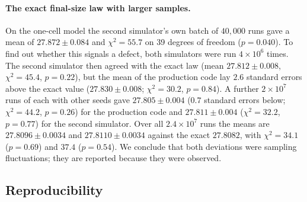 \paragraph{The exact final-size law with larger samples.} On the one-cell model the second simulator's own
batch of $40{,}000$ runs gave a mean of $27.872\pm0.084$ and $\chi^2=55.7$ on 39 degrees of freedom
($p=0.040$).
To find out whether this signals a defect, both simulators were run $4\times10^{6}$ times. The second
simulator then agreed with the exact law (mean $27.812\pm0.008$, $\chi^2=45.4$, $p=0.22$), but the mean of
the production code lay $2.6$ standard errors above the exact value ($27.830\pm0.008$; $\chi^2=30.2$,
$p=0.84$). A further $2\times10^{7}$ runs of each with other seeds gave $27.805\pm0.004$ ($0.7$ standard errors
below; $\chi^2=44.2$, $p=0.26$) for the production code and $27.811\pm0.004$ ($\chi^2=32.2$, $p=0.77$) for the
second simulator. Over all $2.4\times10^{7}$ runs the means are $27.8096\pm0.0034$ and $27.8110\pm0.0034$
against the exact $27.8082$, with $\chi^2=34.1$ ($p=0.69$) and $37.4$ ($p=0.54$). We conclude that both
deviations were sampling fluctuations; they are reported because they were observed.

\subsection{Reproducibility}\label{appA_numerics:sec:repro}

